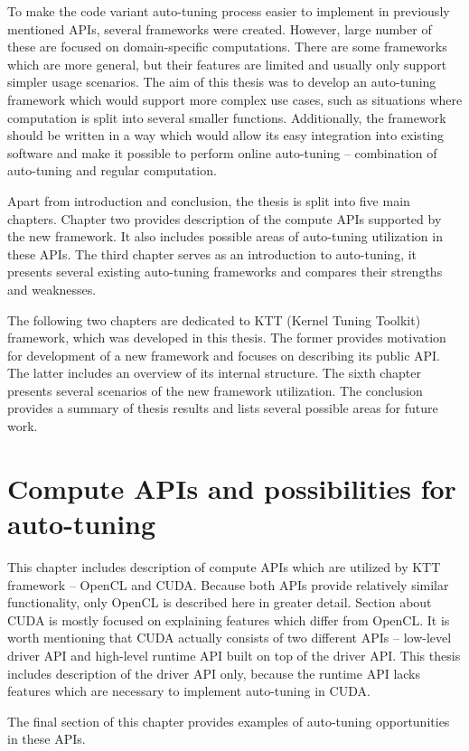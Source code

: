 \documentclass
[
    digital, %
    oneside, %
    table, %
    nolof, %
    nolot, %
    nocover %
]{fithesis3}
\begin{document}
To make the code variant auto-tuning process easier to implement in previously mentioned APIs, several frameworks were created. However, large number of
these are focused on domain-specific computations. There are some frameworks which are more general, but their features are limited and usually only
support simpler usage scenarios. The aim of this thesis was to develop an auto-tuning framework which would support more complex use cases, such as
situations where computation is split into several smaller functions. Additionally, the framework should be written in a way which would allow its easy
integration into existing software and make it possible to perform online auto-tuning -- combination of auto-tuning and regular computation.

Apart from introduction and conclusion, the thesis is split into five main chapters. Chapter two provides description of the compute APIs supported
by the new framework. It also includes possible areas of auto-tuning utilization in these APIs. The third chapter serves as an introduction to
auto-tuning, it presents several existing auto-tuning frameworks and compares their strengths and weaknesses.

The following two chapters are dedicated to KTT (Kernel Tuning Toolkit) framework, which was developed in this thesis. The former provides motivation for
development of a new framework and focuses on describing its public API. The latter includes an overview of its internal structure. The sixth chapter
presents several scenarios of the new framework utilization. The conclusion provides a summary of thesis results and lists several possible areas for
future work.

\chapter{Compute APIs and possibilities for auto-tuning}
This chapter includes description of compute APIs which are utilized by KTT framework -- OpenCL and CUDA. Because both APIs provide relatively similar
functionality, only OpenCL is described here in greater detail. Section about CUDA is mostly focused on explaining features which differ from OpenCL.
It is worth mentioning that CUDA actually consists of two different APIs -- low-level driver API and high-level runtime API built on top of the driver
API. This thesis includes description of the driver API only, because the runtime API lacks features which are necessary to implement auto-tuning in CUDA.

The final section of this chapter provides examples of auto-tuning opportunities in these APIs.
\end{document}
